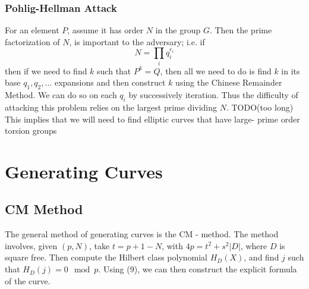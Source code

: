\documentclass[12pt,twoside]{article}
\begin{document}
\subsubsection{Pohlig-Hellman Attack}
For an element $P$, assume it has order $N$ in the group $G$. Then the prime factorization of $N$, is important to the adversary; i.e. if 
$$ N = \prod_{i}q_{i}^{e_{i}} $$ then if we need to find $k$ such that $P^{k} = Q$, then all we need to do is find $k$ in its base $q_{1}, q_{2},...$ expansions and then construct $k$ using the Chinese Remainder Method. We can do so on each $q_{i}$ by successively iteration. Thus the difficulty of attacking this problem relies on the largest prime dividing $N$. TODO(too long) \\ 

This implies that we will need to find elliptic curves that have large- prime order torsion groups




\section{Generating Curves} 

\subsection{CM Method} 
The general method of generating curves is the CM - method. 
The method involves, given $(p, N)$,  take $t = p+1 - N$, with $4p = t^{2} + s^{2}|D|$, where $D$ is square free. Then compute the Hilbert class polynomial $H_{D}(X)$, and find $j$ such that $H_{D}(j) = 0 \mod p$. Using (9), we can then construct the explicit formula of the curve.   













\end{document}
